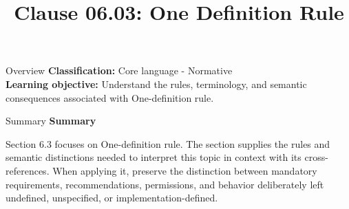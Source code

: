 \documentclass[10pt,letterpaper]{article}
\title{Clause 06.03: One Definition Rule}
\author{}
\date{}
\begin{document}
\maketitle
\begin{CornellOverviewBox}{Overview}
\textbf{Classification:} Core language - Normative\\[2pt]
\textbf{Learning objective:} Understand the rules, terminology, and semantic consequences associated with One-definition rule.
\end{CornellOverviewBox}\begin{CornellSummaryBox}{Summary}
{\sffamily\bfseries\color{Accent} Summary}\par\vspace{3pt}Section 6.3 focuses on One-definition rule. The section supplies the rules and semantic distinctions needed to interpret this topic in context with its cross-references. When applying it, preserve the distinction between mandatory requirements, recommendations, permissions, and behavior deliberately left undefined, unspecified, or implementation-defined.
\end{CornellSummaryBox}
\end{document}
